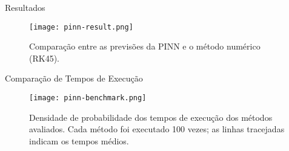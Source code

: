 \begin{frame}{Resultados}
  \begin{figure}
    \centering
    \texttt{[image: pinn-result.png]}
    \caption{Comparação entre as previsões da PINN e o método numérico (RK45).}
  \end{figure}
\end{frame}

\begin{frame}{Comparação de Tempos de Execução}
  \begin{figure}
    \centering
    \texttt{[image: pinn-benchmark.png]}
    \caption{Densidade de probabilidade dos tempos de execução dos métodos avaliados. Cada método foi executado 100 vezes; as linhas tracejadas indicam os tempos médios.}
  \end{figure}
\end{frame}
